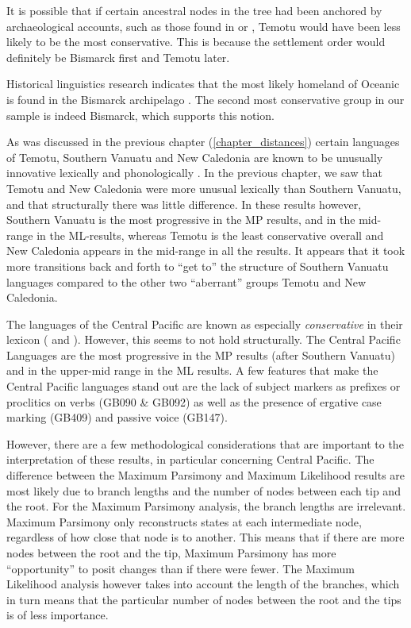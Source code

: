 \documentclass[draft,10pt]{article} %
\begin{document}
It is possible that if certain ancestral nodes in the tree had been anchored by archaeological accounts, such as those found in \cite{rieth_cochrane_2018} or \citet{kirch2017road}, Temotu would have been less likely to be the most conservative. This is because the settlement order would definitely be Bismarck first and Temotu later.

Historical linguistics research indicates that the most likely homeland of Oceanic is found in the Bismarck archipelago \citep[97]{lynchrosscrowleyinternalsubgroupingoceanic}. The second most conservative group in our sample is indeed Bismarck, which supports this notion.

As was discussed in the previous chapter (\ref{chapter_distances}) certain languages of Temotu, Southern Vanuatu and New Caledonia are known to be unusually innovative lexically and phonologically \citep{grace1981indirect, grace_1992_aberrant, pawley2006explaining}. In the previous chapter, we saw that Temotu and New Caledonia were more unusual lexically than Southern Vanuatu, and that structurally there was little difference. In these results however,  Southern Vanuatu is the most progressive in the MP results, and in the mid-range in the ML-results, whereas Temotu is the least conservative overall and New Caledonia appears in the mid-range in all the results. It appears that it took more transitions back and forth to ``get to'' the structure of Southern Vanuatu languages compared to the other two ``aberrant'' groups Temotu and New Caledonia.

The languages of the Central Pacific are known as especially \emph{conservative} in their lexicon (\citet{blust1981, blust2000lexicostatistics} and \citet{pawley_2009_solomons}). However, this seems to not hold structurally. The Central Pacific Languages are the most progressive in the MP results (after Southern Vanuatu) and in the upper-mid range in the ML results. A few features that make the Central Pacific languages stand out are the lack of subject markers as prefixes or proclitics on verbs (GB090 \& GB092) as well as the presence of ergative case marking (GB409) and passive voice (GB147).


However, there are a few methodological considerations that are important to the interpretation of these results, in particular concerning Central Pacific. The difference between the Maximum Parsimony and Maximum Likelihood results are most likely due to branch lengths and the number of nodes between each tip and the root. For the Maximum Parsimony analysis, the branch lengths are irrelevant. Maximum Parsimony only reconstructs states at each intermediate node, regardless of how close that node is to another. This means that if there are more nodes between the root and the tip, Maximum Parsimony has more ``opportunity'' to posit changes than if there were fewer. The Maximum Likelihood analysis however takes into account the length of the branches, which in turn means that the particular number of nodes between the root and the tips is of less importance.
\end{document}
